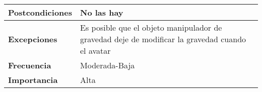 \begin{tabularx}{\columnwidth}{l|l}
\begin{minipage}{0.25\columnwidth}
\textbf{Postcondiciones} 
\end{minipage}
&
\begin{minipage}{0.65\columnwidth}
No las hay
\end{minipage}
\\ \hline

\begin{minipage}{0.25\columnwidth}
\textbf{Excepciones} 
\end{minipage}
&
\begin{minipage}{0.65\columnwidth}
Es posible que el objeto manipulador de gravedad deje de modificar la gravedad cuando el avatar 
\end{minipage}
\\ \hline

\begin{minipage}{0.25\columnwidth}
\textbf{Frecuencia} 
\end{minipage}
&
\begin{minipage}{0.65\columnwidth}
Moderada-Baja
\end{minipage}
\\ \hline

\begin{minipage}{0.25\columnwidth}
\textbf{Importancia} 
\end{minipage}
&
\begin{minipage}{0.65\columnwidth}
Alta
\end{minipage}
\\ \hline
\end{tabularx}

